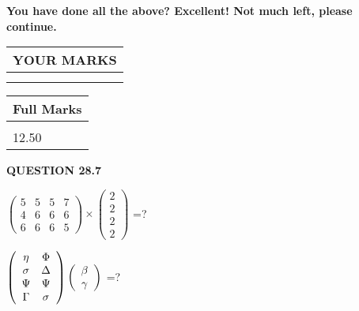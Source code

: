 \documentclass[12pt]{article}
\begin{document}
  
 
   
   
\vspace{0.3in}
{\textbf{\LARGE{You have done all the above? Excellent! Not much left, please continue.}}}
\vspace{0.3in}
   
   
  
\vspace{0.2in}
  
\noindent\begin{tabular}{|l|}
\hline
 YOUR MARKS  \\
\hline
 \\ 
 \\ 
\hline
\end{tabular}
\hspace{0.05in} \begin{tabular}{|l|}
\hline
 Full Marks  \\
\hline
 \\ 
12.50 \\
\hline
\end{tabular}
{\textbf{\Large{QUESTION
28.7 
}}}
  
  
 
$ \left( \begin{array}{ccccccccc}
           5  & 
           5  & 
           5  & 
           7  \\ 
           4  & 
           6  & 
           6  & 
           6  \\ 
           6  & 
           6  & 
           6  & 
           5
\end{array}\right) \times
\left( \begin{array}{c}
           2  \\ 
           2  \\ 
           2  \\ 
           2
\end{array}\right) $ =?
 
 
$  %
 \left( \begin{array}
 {
 c
 c
 }
 \eta & 
 \Phi \\ 
 \sigma & 
 \Delta \\ 
 \Psi & 
 \Psi \\ 
 \Gamma & 
 \sigma
 \end{array} \right)
 \left( \begin{array}
 {
 c
 }
 \beta \\ 
 \gamma
 \end{array} \right)
$ =?
 
\end{document}
